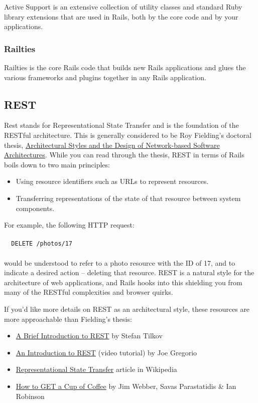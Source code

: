 \documentclass[10pt]{book}
\begin{document}
Active Support is an extensive collection of utility classes and standard Ruby library extensions that are used in Rails, both by the core code and by your applications.

\subsubsection{ Railties}

Railties is the core Rails code that builds new Rails applications and glues the various frameworks and plugins together in any Rails application.

\subsection{ REST}

Rest stands for Representational State Transfer and is the foundation of the RESTful architecture. This is generally considered to be Roy Fielding’s doctoral thesis, \href{http://www.ics.uci.edu/%7Efielding/pubs/dissertation/top.htm}{Architectural Styles and the Design of Network-based Software Architectures}. While you can read through the thesis, REST in terms of Rails boils down to two main principles:
\begin{itemize}
	\item Using resource identifiers such as URLs to represent resources.
	\item Transferring representations of the state of that resource between system components.
\end{itemize}

\begin{minipage}{\textwidth}
For example, the following HTTP request:
\\ \\
\verb+	DELETE /photos/17+
\\ \\
would be understood to refer to a photo resource with the ID of 17, and to indicate a desired action – deleting that resource. REST is a natural style for the architecture of web applications, and Rails hooks into this shielding you from many of the RESTful complexities and browser quirks.
\end{minipage}


If you’d like more details on REST as an architectural style, these resources are more approachable than Fielding’s thesis:
\begin{itemize}
	\item \href{http://www.infoq.com/articles/rest-introduction}{A Brief Introduction to REST} by Stefan Tilkov
	\item \href{http://bitworking.org/news/373/An-Introduction-to-REST}{An Introduction to REST} (video tutorial) by Joe Gregorio
	\item \href{http://en.wikipedia.org/wiki/Representational_State_Transfer}{Representational State Transfer} article in Wikipedia
	\item \href{http://www.infoq.com/articles/webber-rest-workflow}{How to GET a Cup of Coffee} by Jim Webber, Savas Parastatidis \& Ian Robinson
\end{itemize}
\end{document}
